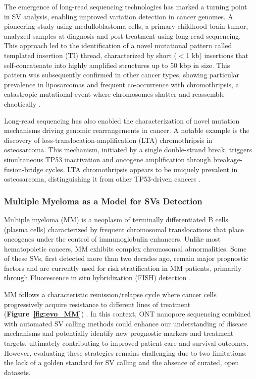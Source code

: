 The emergence of long-read sequencing technologies has marked a turning point in 
SV analysis, enabling improved variation detection in cancer genomes. A pioneering 
study using medulloblastoma cells, a primary childhood brain tumor, analyzed samples 
at diagnosis and post-treatment using long-read sequencing. This approach led to 
the identification of a novel mutational pattern called templated insertion (TI) 
thread, characterized by short ($<$1 kb) insertions that self-concatenate into highly 
amplified structures up to 50 kbp in size. This pattern was subsequently confirmed 
in other cancer types, showing particular prevalence in liposarcomas and frequent 
co-occurrence with chromothripsis, a catastropic mutational event where 
chromosomes shatter and reassemble chaotically \cite{rausch_long-read_2023}.

Long-read sequencing has also enabled the characterization of novel mutation 
mechanisms driving genomic rearrangements in cancer. A notable example is the 
discovery of loss-translocation-amplification (LTA) chromothripsis in osteosarcoma. 
This mechanism, initiated by a single double-strand break, triggers simultaneous 
TP53 inactivation and oncogene amplification through breakage-fusion-bridge cycles. 
LTA chromothripsis appears to be uniquely prevalent in osteosarcoma, distinguishing 
it from other TP53-driven cancers \cite{valle-inclan_ongoing_2025}.

\subsubsection{Multiple Myeloma as a Model for SVs Detection}

Multiple myeloma (MM) is a neoplasm of terminally differentiated B cells (plasma 
cells) characterized by frequent chromosomal translocations that place oncogenes 
under the control of immunoglobulin enhancers. Unlike most hematopoietic cancers, 
MM exhibits complex chromosomal abnormalities. Some of these SVs, first detected 
more than two decades ago, remain major prognostic factors 
and are currently used for risk stratification in MM patients, primarily through 
Fluorescence in situ hybridization (FISH) detection \cite{kuehl_multiple_2002}.

MM follows a characteristic remission/relapse cycle where cancer cells progressively 
acquire resistance to different lines of treatment (\textbf{Figure~\ref{fig:evo_MM}})
\cite{kurtin_relapsed_2013}. In this context, ONT nanopore sequencing combined 
with automated SV calling methods could enhance our understanding of disease 
mechanisms and potentially identify new prognostic markers and treatment 
targets, ultimately contributing to improved patient care and survival outcomes. 
However, evaluating these strategies remains challenging due to two limitations: 
the lack of a golden standard for SV calling and the absence of curated, open 
datasets.

